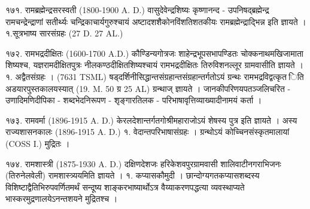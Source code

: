 १७१. रामब्रह्मेन्द्रसरस्वती (1800-1900 A. D.)
वासुदेवेन्द्रशिष्यः कृष्णानन्द - उपनिषद्ब्रह्मेन्द्र रामचन्द्रेन्द्राणां सतीर्थ्यः चन्द्रिकाचार्यगुरुश्चायं अष्टादशशैकोनविंशतिशतकीयः रामब्रह्मेन्द्राद्भिन्न इति ज्ञायते ।
१.सूत्रभाष्य सारसंग्रहः (27 D. 27 AL.)

१७२. रामभद्रदीक्षितः (1600-1700 A.D.)
कौण्डिन्यगोत्रजः शाहेन्द्रभूपसभापण्डितः चोक्कनाथमखिजामाता शिष्यश्च, यज्ञरामदीक्षितपुत्रः नीलकण्ठदीक्षितशिष्यश्चायं रामभद्रदीक्षितः तिरुविशनल्लूर ग्रामवासीति ज्ञायते ।
१. अद्वैतसंग्रहः । (7631 TSML)
षड्दर्शिनीसिद्धान्तसंग्रहान्तसंग्रहान्तर्गतोऽयं ग्रन्थः रामभद्रविद्वत्कृत िति अडयारपुस्तकालयस्यात् (19. M. 50 ग्र 25 AL) ग्रन्थाज् ज्ञायते । जानकीपरिणयपतञ्जलिचरित - उणादिमणिदीपिका - शब्दभेदनिरूपण - शृङ्गारतिलक - परिभाषावृत्तिव्याख्यादीनामयं कर्ता ।

१७३. रामवर्मा (1896-1915 A. D.)
केरलदेशान्तर्गतगोश्रीमहाराजोऽयं शेषस्य पुत्र इति ज्ञायते । अस्य राज्यशासनकालः (1896-1915 A. D.)
१. वेदान्तपरिभाषासंग्रहः । ग्रन्थोऽयं कोच्चिनसंस्कृतमालायां (COSS I.) मुद्रितः ।

१७४. रामशास्त्री (1875-1930 A. D.)
दक्षिणदेशजः हरिकेशवपुरग्रामवासी शालिवाटीनगराभिजनः (तिरुनेलवेली) रामशास्त्र्ययमिति ज्ञायते ।
१. कप्यासकौमुदी । छान्दोग्यगतकप्यासशब्दस्य विशिष्टाद्वैतिभिरुपवर्णितमर्थं सन्दूष्य शाङ्करभाष्यार्थोऽत्र वैय्याकरणपद्धत्या व्यवस्थाप्यते भास्करमुद्रणालयेऽनन्तशयने मुद्रितश्च ।

